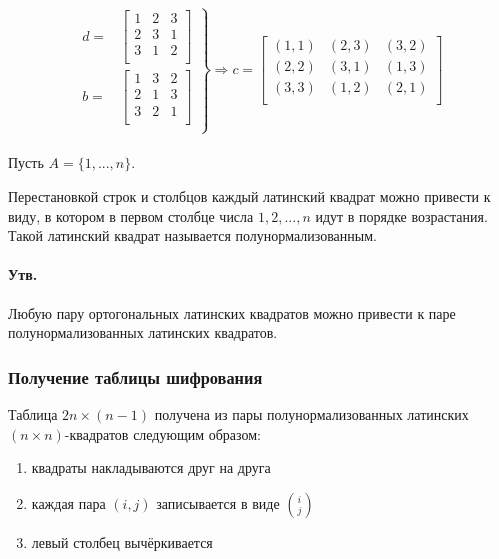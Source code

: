 \documentclass[a4paper,12pt]{article}
\begin{document}
$$
\left. \begin{aligned} 
	d = & \begin{bmatrix}
		1 & 2 & 3 \\
		2 & 3 & 1 \\
		3 & 1 & 2 \\
	\end{bmatrix} \\
	b = & \begin{bmatrix}
		1 & 3 & 2 \\
		2 & 1 & 3 \\
		3 & 2 & 1 \\
	\end{bmatrix} \\
\end{aligned} \right\}  \Rightarrow  c = \begin{bmatrix}
(1,1) & (2,3) & (3,2) \\
(2,2) & (3,1) & (1,3) \\
(3,3) & (1,2) & (2,1) \\
\end{bmatrix}
$$ \\

Пусть $A = \{1, ..., n\}$.

Перестановкой строк и столбцов каждый латинский квадрат
можно привести к виду, в котором в первом столбце числа
$1,2, ..., n$ идут в порядке возрастания. Такой латинский квадрат называется полунормализованным.

\paragraph{Утв.}
Любую пару ортогональных латинских квадратов можно привести к паре полунормализованных латинских квадратов.

\subsubsection{Получение таблицы шифрования}
Таблица $2 n \times (n-1)$ получена из пары полунормализованных латинских $(n\times n)$-квадратов следующим образом:

\begin{enumerate}
	\item квадраты накладываются друг на друга
	\item каждая пара $(i,j)$ записывается в виде $\binom{i}{j}$
	\item левый столбец вычёркивается
\end{enumerate}
\end{document}
